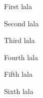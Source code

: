\documentclass[handout]{beamer}
\begin{document}
\begin{frame}{First}
lala
\end{frame}

\begin{frame}{Second}
lala
\end{frame}

\begin{frame}{Third}
lala
\end{frame}

\begin{frame}{Fourth}
lala
\end{frame}

\begin{frame}{Fifth}
lala
\end{frame}

\begin{frame}{Sixth}
lala
\end{frame}
\end{document}
